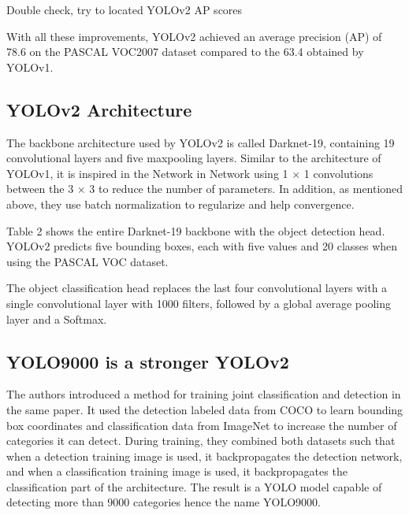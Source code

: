 \documentclass{article}
\begin{document}
Double check, try to located YOLOv2 AP scores

With all these improvements, YOLOv2 achieved an average precision (AP) of 78.6 on the PASCAL VOC2007 dataset compared to the 63.4 obtained by YOLOv1.

\subsection{YOLOv2 Architecture}



The backbone architecture used by YOLOv2 is called Darknet-19, containing 19 convolutional layers and five maxpooling layers. Similar to the architecture of YOLOv1, it is inspired in the Network in Network \cite{lin2013network} using 1 × 1 convolutions between the 3 × 3 to reduce the number of parameters. In addition, as mentioned above, they use batch normalization to regularize and help convergence.

Table 2 shows the entire Darknet-19 backbone with the object detection head. YOLOv2 predicts five bounding boxes, each with five values and 20 classes when using the PASCAL VOC dataset.

The object classification head replaces the last four convolutional layers with a single convolutional layer with 1000 filters, followed by a global average pooling layer and a Softmax.

\subsection{YOLO9000 is a stronger YOLOv2}

The authors introduced a method for training joint classification and detection in the same paper. It used the detection labeled data from COCO \cite{COCO} to learn bounding box coordinates and classification data from ImageNet to increase the number of categories it can detect. During training, they combined both datasets such that when a detection training image is used, it backpropagates the detection network, and when a classification training image is used, it backpropagates the classification part of the architecture. The result is a YOLO model capable of detecting more than 9000 categories hence the name YOLO9000.

\end{document}

